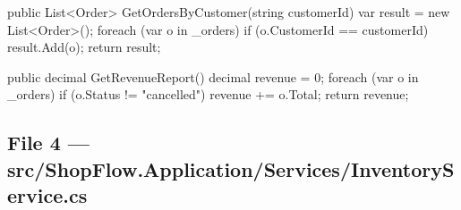 \documentclass[11pt,a4paper]{article}
\begin{document}
\begin{codeframe}
\begin{codeblock}
{    public List<Order> GetOrdersByCustomer(string customerId)
    {
        var result = new List<Order>();
        foreach (var o in _orders)
            if (o.CustomerId == customerId)
                result.Add(o);
        return result;
    }

    public decimal GetRevenueReport()
    {
        decimal revenue = 0;
        foreach (var o in _orders)
            if (o.Status != "cancelled")
                revenue += o.Total;
        return revenue;
    }
}
\end{codeblock}
\end{codeframe}

\subsection{File 4 --- src/ShopFlow.Application/Services/InventoryService.cs}
\end{document}

